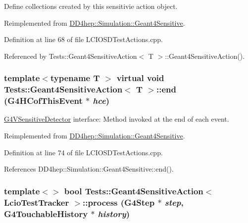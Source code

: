 Define collections created by this sensitivie action object. 

Reimplemented from \hyperlink{class_d_d4hep_1_1_simulation_1_1_geant4_sensitive_a88c872b79e49e399c8ee282960c2d77d}{DD4hep::Simulation::Geant4Sensitive}.

Definition at line 68 of file LCIOSDTestActions.cpp.

Referenced by Tests::Geant4SensitiveAction$<$ T $>$::Geant4SensitiveAction().\hypertarget{class_tests_1_1_geant4_sensitive_action_aeeb492550f054b8dd9f4780601fc1d66}{
\subsubsection[{end}]{\setlength{\rightskip}{0pt plus 5cm}template$<$typename T $>$ virtual void {\bf Tests::Geant4SensitiveAction}$<$ {\bf T} $>$::end (G4HCofThisEvent $\ast$ {\em hce})}}
\label{class_tests_1_1_geant4_sensitive_action_aeeb492550f054b8dd9f4780601fc1d66}


\hyperlink{class_g4_v_sensitive_detector}{G4VSensitiveDetector} interface: Method invoked at the end of each event. 

Reimplemented from \hyperlink{class_d_d4hep_1_1_simulation_1_1_geant4_sensitive_abcce05101539a9941c06aada4625a608}{DD4hep::Simulation::Geant4Sensitive}.

Definition at line 74 of file LCIOSDTestActions.cpp.

References DD4hep::Simulation::Geant4Sensitive::end().\hypertarget{class_tests_1_1_geant4_sensitive_action_acd1c0fc85d8ade97401c76f14bf2b32b}{
\subsubsection[{process}]{\setlength{\rightskip}{0pt plus 5cm}template$<$$>$ bool {\bf Tests::Geant4SensitiveAction}$<$ {\bf LcioTestTracker} $>$::process (G4Step $\ast$ {\em step}, \/  G4TouchableHistory $\ast$ {\em history})}}
\label{class_tests_1_1_geant4_sensitive_action_acd1c0fc85d8ade97401c76f14bf2b32b}


